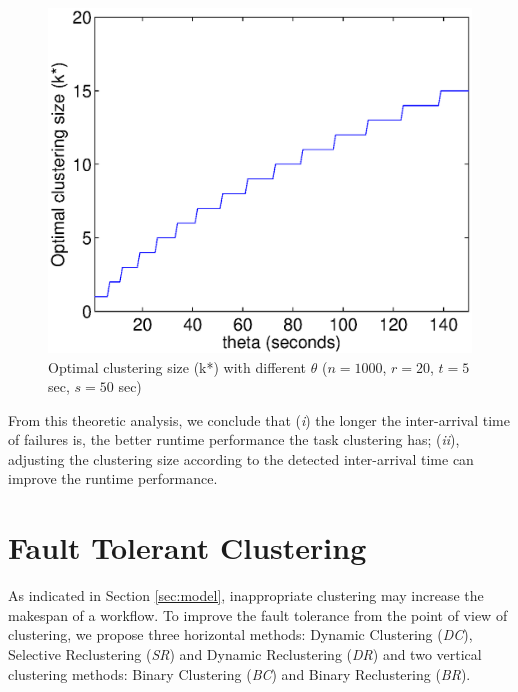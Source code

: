 \documentclass{IOS-Book-Article}
\begin{document}
\begin{figure}[!htb]
\centering
  \includegraphics[width=0.75\linewidth]{figure6.eps}
  \caption{Optimal clustering size (k*) with different  $\theta$ ($n=1000$, $r=20$, $t=5$ sec, $s=50$ sec)}
  \label{fig:model_size}
\end{figure}


From this theoretic analysis, we conclude that (\emph{i}) the longer the inter-arrival time of failures is, the better runtime performance the task clustering has; (\emph{ii}), adjusting the clustering size according to the detected inter-arrival time can improve the runtime performance. 

\section{Fault Tolerant Clustering}
\label{sec:clustering}

As indicated in Section \ref{sec:model}, inappropriate clustering may increase the makespan of a workflow. To improve the fault tolerance from the point of view of clustering, we propose three horizontal methods: Dynamic Clustering (\emph{DC}), Selective Reclustering (\emph{SR}) and Dynamic Reclustering (\emph{DR}) and two vertical clustering methods: Binary Clustering (\emph{BC}) and Binary Reclustering (\emph{BR}). 
\end{document}
